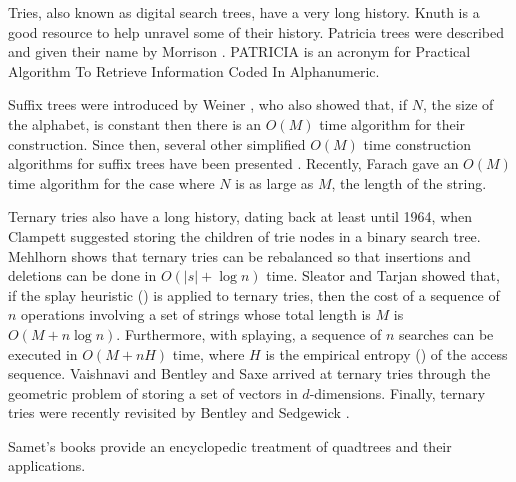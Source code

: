 Tries, also known as digital search trees, have a very long history.
Knuth \cite{k73c} is a good resource to help unravel some of their
history.  Patricia trees were described and given their name by
Morrison \cite{m68}.  PATRICIA is an acronym for Practical Algorithm
To Retrieve Information Coded In Alphanumeric.

Suffix trees were introduced by Weiner \cite{w73}, who also showed
that, if $N$, the size of the alphabet, is constant then there is an
$O(M)$ time algorithm for their construction.  Since then, several
other simplified $O(M)$ time construction algorithms for suffix trees
have been presented \cite{cs85,m76}.  Recently, Farach \cite{f97} gave
an $O(M)$ time algorithm for the case where $N$ is as large as $M$,
the length of the string.

Ternary tries also have a long history, dating back at least until
1964, when Clampett \cite{c64} suggested storing the children of trie
nodes in a binary search tree.  Mehlhorn \cite{m79} shows that ternary
tries can be rebalanced so that insertions and deletions can be done
in $O(|s|+\log n)$ time.  Sleator and Tarjan \cite{st85} showed that,
if the splay heuristic () is applied to ternary
tries, then the cost of a sequence of $n$ operations involving a set
of strings whose total length is $M$ is $O(M+n\log n)$.  Furthermore,
with splaying, a sequence of $n$ searches can be executed in $O(M+
nH)$ time, where $H$ is the empirical entropy () of
the access sequence.  Vaishnavi \cite{v84} and Bentley and Saxe
\cite{bs79} arrived at ternary tries through the geometric problem of
storing a set of vectors in $d$-dimensions.  Finally, ternary tries
were recently revisited by Bentley and Sedgewick \cite{bs97}.

Samet's books \cite{s90,sXX,sYY} provide an encyclopedic treatment of
quadtrees and their applications.


